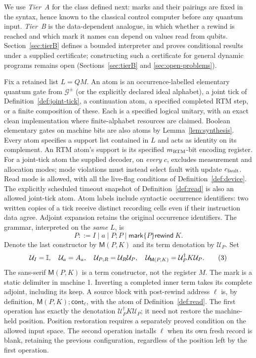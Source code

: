 We use \emph{Tier~A} for the class defined next: marks and their pairings are
fixed in the syntax, hence known to the classical control computer before any
quantum input. \emph{Tier~B} is the data-dependent analogue, in which
whether a rewind is reached and which mark it names can depend on values read
from qubits. Section~\ref{sec:tierB} defines a bounded interpreter and proves
conditional results under a supplied certificate; constructing such a
certificate for general dynamic programs remains open
(Sections~\ref{sec:tierB} and \ref{sec:open-problems}).

\begin{definition}
\label{def:tiera}
Fix a retained list $L=QM$. An atom is an occurrence-labelled elementary
quantum gate from $\mathcal G^{\pm}$ (or the explicitly declared ideal
alphabet), a joint tick of Definition~\ref{def:joint-tick}, a continuation atom, a specified
completed RTM step, or a finite composition of these. Each is a specified
logical unitary, with an exact clean implementation where finite-alphabet
resources are claimed. Boolean elementary gates on machine bits are
also atoms by Lemma~\ref{lem:synthesis}.
Every atom specifies a support list contained in $L$ and acts as identity
on its complement. An RTM atom's support is its specified
$m_{\rm RTM}$-bit encoding register. For a joint-tick atom the supplied
decoder, on \emph{every} $c$, excludes measurement and allocation modes;
mode violations must instead select fault with update $c_{\rm fault}$.
Read mode is allowed, with all the live-flag conditions of
Definition~\ref{def:device}. The explicitly scheduled timeout snapshot
of Definition~\ref{def:read} is also an allowed joint-tick atom.
Atom labels include syntactic occurrence identifiers: two written copies
of a tick receive distinct recording cells even if their instruction
data agree. Adjoint expansion retains the original occurrence identifiers.
The grammar, interpreted on the \emph{same} $L$, is
\[
 P::=I\mid a\mid P;P\mid \mathsf{mark}\{P\}\mathsf{rewind}\ K.
\]
Denote the last constructor by $\mathsf M(P,K)$ and its term denotation
by $\mathcal U_P$. Set
\[
 \mathcal U_I=\mathbb{I},
 \quad\mathcal U_a=A_a,
 \quad\mathcal U_{P;R}=\mathcal U_R\mathcal U_P,
 \quad\mathcal U_{\mathsf M(P,K)}
   =\mathcal U_P^\dagger K\mathcal U_P.       \tag{3}
\]
The sans-serif $\mathsf M(P,K)$ is a term constructor, not the register $M$.
The mark is a static delimiter in machine 1. Inverting a completed inner
term takes its complete adjoint, including its keep. A source block with
post-rewind address $\ell$ is, by definition,
$\mathsf M(P,K);\mathsf{cont}_\ell$, with the atom of
Definition~\ref{def:read}. The first operation has exactly the denotation
$\mathcal U_P^\dagger K\mathcal U_P$; it need not restore the machine-held
position. Position restoration requires a separately proved condition
on the allowed input space. The second operation installs $\ell$ when
its own fresh record is blank, retaining the previous configuration,
regardless of the position left by the first operation.


\end{definition}
